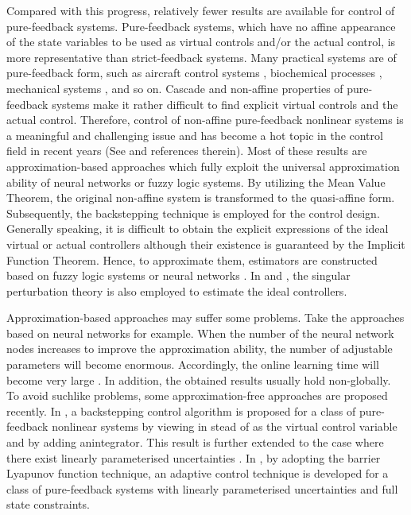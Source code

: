 \documentclass{tSYS2e}
\theoremstyle{plain}
\theoremstyle{definition}
\begin{document}
Compared with this progress, relatively fewer results are available for control
of pure-feedback systems. Pure-feedback systems, which have no
affine appearance of the state variables to be used as virtual controls
and/or the actual control, is more representative than
strict-feedback systems. Many practical systems are of pure-feedback form,
such as aircraft control systems \citep{Hunt1997}, biochemical processes \citep
{Krstic1995}, mechanical systems \citep{Ferrara2000}, and so on. Cascade and non-affine
properties of pure-feedback systems make it rather difficult to find
explicit virtual controls and the actual control. Therefore, control of
non-affine pure-feedback nonlinear systems is a meaningful and challenging
issue and has become a hot topic in the control field in recent
years (See \cite{Liu2016, Tong2016} and references therein). Most of these
results are approximation-based approaches which fully exploit the universal
approximation ability of neural networks or fuzzy logic systems.
By utilizing the Mean Value Theorem, the original non-affine
system is transformed to the quasi-affine form. Subsequently, the
backstepping technique is employed for the control design. Generally speaking,
it is difficult to obtain the explicit expressions of the ideal
virtual or actual controllers although their existence is guaranteed by the
Implicit Function Theorem. Hence, to approximate them,
estimators are constructed based on fuzzy logic systems \citep{Gao2013,
Li2015, Yu2013, Zhang2010} or  neural networks \citep{Shen2014, Sun2013,
Wang2006, Wang2011, Wang2013}. In \cite{Yoo2012} and \cite{Gao2012}, the singular perturbation
theory is also employed to estimate the ideal controllers.

Approximation-based approaches may suffer some problems. Take the approaches based on neural networks for example.
When the number of the neural network nodes increases to improve the approximation ability,
the number of adjustable parameters will become enormous. Accordingly, the online learning time will become very large \citep{Tong2016}.
In addition, the obtained results usually hold non-globally. To avoid suchlike problems, some approximation-free approaches are proposed
recently. In \cite{Liu2014}, a backstepping control algorithm is proposed
for a class of pure-feedback nonlinear systems by viewing  in stead of
 as the virtual control variable and by adding anintegrator.
This result is further extended to the case where there exist linearly parameterised uncertainties \citep{Liu2016}.
In \cite{Tong2016}, by adopting the barrier Lyapunov function technique,
an adaptive control technique is developed for a class of pure-feedback
systems with linearly parameterised uncertainties and full state constraints.
\end{document}
